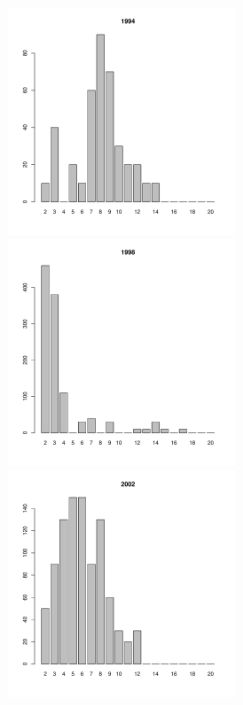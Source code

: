 \begin{figure}[hp]
	\begin{minipage}[b]{.3\linewidth}
	\begin{center}
	\includegraphics[width=60mm]{../White_Sea/Luvenga_Goreliy/low2_1994_.pdf}
	\end{center}
	\end{minipage}
	\hfill
	\begin{minipage}[b]{.3\linewidth}
	\begin{center}
	\includegraphics[width=60mm]{../White_Sea/Luvenga_Goreliy/low2_1998_.pdf}
	\end{center}
	\end{minipage}	
	\hfill
	\begin{minipage}[b]{.3\linewidth}
	\begin{center}
	\includegraphics[width=60mm]{../White_Sea/Luvenga_Goreliy/low2_2002_.pdf}
	\end{center}
	\end{minipage}


\end{figure}
